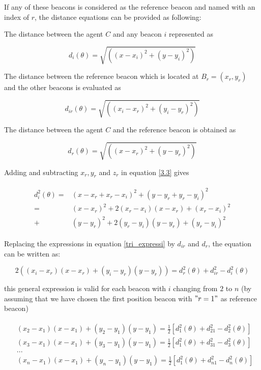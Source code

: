 If any of these beacons is considered as the reference beacon and named with an index of $r$, the distance equations can be provided as following:

The distance between the agent $C$ and any beacon $i$ represented as

\begin{equation} \label{3.3}
d_i(\theta) = \sqrt{\left((x - x_i)^2 + (y - y_i)^2\right)}
\end{equation}

The distance between the reference beacon which is located at $B_r = (x_r,y_r)$ and the other beacons is evaluated as

\begin{equation}
d_{ir}(\theta) = \sqrt{\left((x_i - x_r)^2 + (y_i - y_r)^2\right)}
\end{equation}

The distance between the agent $C$ and the reference beacon is obtained as

\begin{equation}
d_r(\theta) = \sqrt{\left((x - x_r)^2 + (y - y_r)^2\right)}
\end{equation}

Adding and subtracting $x_r, y_r$ and $z_r$ in equation \ref{3.3} gives

\begin{align} \label{tri_expressi}
\begin{split}
d_i^2(\theta) = & (x - x_r + x_r - x_i)^2 + (y - y_r + y_r - y_i)^2 \\ 
              = & (x - x_r)^2 + 2(x_r - x_i)(x - x_r) + (x_r-x_i)^2 \\
              + & (y - y_r)^2 + 2(y_r - y_i)(y - y_r) + (y_r - y_i)^2
\end{split}
\end{align}

Replacing the expressions in equation \ref{tri_expressi} by $d_{ir}$ and $d_r$, the equation can be written as:

\begin{equation}
 2((x_i - x_r)(x - x_r) + (y_i - y_r)(y - y_r)) = d_r^2(\theta) + d_{ir}^2 - d_i^2(\theta)
\end{equation}

this general expression is valid for each beacon with $i$ changing from $2$ to $n$ (by assuming that we have chosen the first position beacon with $"r=1"$ as reference beacon)

\begin{align}
\begin{split}
& (x_2 - x_1)(x - x_1) + (y_2 - y_1)(y - y_1) = \frac{1}{2} [d_1^2(\theta) + d_{21}^2 - d_2^2(\theta)] \\
& (x_3 - x_1)(x - x_1) + (y_3 - y_1)(y - y_1) = \frac{1}{2} [d_1^2(\theta) + d_{31}^2 - d_3^2(\theta)] \\
& ... \\
& (x_n - x_1)(x - x_1) + (y_n - y_1)(y - y_1) = \frac{1}{2} [d_1^2(\theta) + d_{n1}^2 - d_n^2(\theta)]
\end{split}
\end{align}

